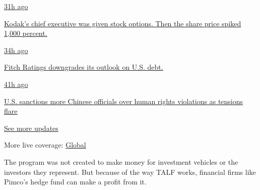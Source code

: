\href{https://www.nytimes.com/live/2020/07/31/business/stock-market-today-coronavirus?action=click\&pgtype=Article\&state=default\&region=MAIN_CONTENT_1\&context=storylines_live_updates\#kodaks-chief-executive-was-given-stock-options-then-the-share-price-spiked-1000-percent}{31h
ago}

\href{https://www.nytimes.com/live/2020/07/31/business/stock-market-today-coronavirus?action=click\&pgtype=Article\&state=default\&region=MAIN_CONTENT_1\&context=storylines_live_updates\#kodaks-chief-executive-was-given-stock-options-then-the-share-price-spiked-1000-percent}{Kodak's
chief executive was given stock options. Then the share price spiked
1,000 percent.}

\href{https://www.nytimes.com/live/2020/07/31/business/stock-market-today-coronavirus?action=click\&pgtype=Article\&state=default\&region=MAIN_CONTENT_1\&context=storylines_live_updates\#fitch-ratings-downgrades-its-outlook-on-us-debt}{34h
ago}

\href{https://www.nytimes.com/live/2020/07/31/business/stock-market-today-coronavirus?action=click\&pgtype=Article\&state=default\&region=MAIN_CONTENT_1\&context=storylines_live_updates\#fitch-ratings-downgrades-its-outlook-on-us-debt}{Fitch
Ratings downgrades its outlook on U.S. debt.}

\href{https://www.nytimes.com/live/2020/07/31/business/stock-market-today-coronavirus?action=click\&pgtype=Article\&state=default\&region=MAIN_CONTENT_1\&context=storylines_live_updates\#us-sanctions-more-chinese-officials-over-human-rights-violations-as-tensions-flare}{41h
ago}

\href{https://www.nytimes.com/live/2020/07/31/business/stock-market-today-coronavirus?action=click\&pgtype=Article\&state=default\&region=MAIN_CONTENT_1\&context=storylines_live_updates\#us-sanctions-more-chinese-officials-over-human-rights-violations-as-tensions-flare}{U.S.
sanctions more Chinese officials over human rights violations as
tensions flare}

\href{https://www.nytimes.com/live/2020/07/31/business/stock-market-today-coronavirus?action=click\&pgtype=Article\&state=default\&region=MAIN_CONTENT_1\&context=storylines_live_updates}{See
more updates}

More live coverage:
\href{https://www.nytimes.com/2020/08/01/world/coronavirus-covid-19.html?action=click\&pgtype=Article\&state=default\&region=MAIN_CONTENT_1\&context=storylines_live_updates}{Global}

The program was not created to make money for investment vehicles or the
investors they represent. But because of the way TALF works, financial
firms like Pimco's hedge fund can make a profit from it.

